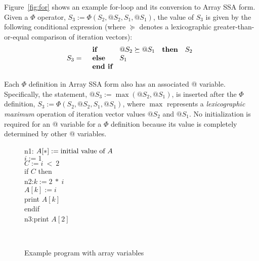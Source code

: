 Figure~\ref{fig:for} shows an example for-loop and its conversion to
Array SSA form.  
Given a $\Phi$ operator,
$S_3 := \Phi(S_2, @S_2, S_1, @S_1)$,
the value of $S_3$ is given by the following 
conditional expression (where $\succeq$ denotes a lexicographic greater-than-or-equal
comparison of iteration vectors):
\begin{eqnarray*}
S_3 & = &
  \begin{array}{llll}
\mbox{\bf if} & @S_2 \succeq @S_1 & {\bf then} & S_2 \\
\mbox{\bf else} & S_1 \\
\mbox{\bf end if} 
  \end{array}
\end{eqnarray*}

Each $\Phi$ definition in Array SSA form also has an associated @ variable.
Specifically, the statement, $@S_3 := \max(@S_2,
@S_1)$, is inserted after the
$\Phi$ definition, $S_3 := \Phi(S_2, @S_2, S_1, @S_1)$, where $\max$ represents a {\it lexicographic maximum}
operation of iteration vector values $@S_2$ and $@S_1$.
No initialization is required
for an @ variable for a $\Phi$ definition
because its value is completely determined by other @ variables.


\begin{figure}%
\begin{center}
\parbox{3.0in}{
\begin{programa}
\mbox{n1:}
\Tb $A[*] := \mbox{\rm initial value of $A$}$\\
\Tb$i := 1$ \\
\Tb $C := i\ <\ 2 $\\
\Tb if $C$ then \\
\mbox{n2:}\Tc $k := 2\ *\ i$ \\
\Tc $A[k] := i$\\
\Tc print $A[k]$\\
\Tb endif \\
\mbox{n3:}\Tb print $A[2]$
\end{programa}
}\\
\end{center}
\caption{Example program with array variables}
\label{fig:ssa-acyclic-array}
\end{figure}


